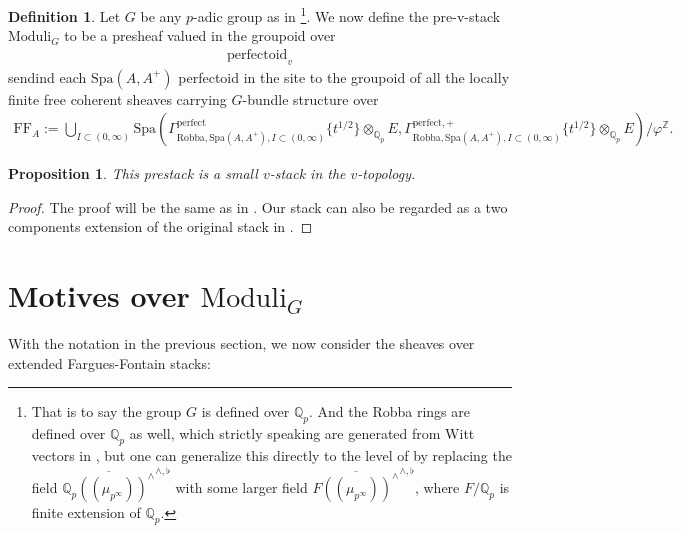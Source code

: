 \documentclass[12pt]{book}
\newtheorem{proposition}{Proposition}
\theoremstyle{definition}
\newtheorem{definition}{Definition}
\begin{document}
\begin{definition}
Let $G$ be any $p$-adic group as in \cite{FS}\footnote{That is to say the group $G$ is defined over $\mathbb{Q}_p$. And the Robba rings are defined over $\mathbb{Q}_p$ as well, which strictly speaking are generated from Witt vectors in \cite{KL1}, but one can generalize this directly to the level of \cite{KL2} by replacing the field $\overline{{\mathbb{Q}}_p((\mu_{p^\infty}))^\wedge}^{\wedge,\flat}$ with some larger field $\overline{F((\mu_{p^\infty}))^\wedge}^{\wedge,\flat}$, where $F/\mathbb{Q}_p$ is finite extension of $\mathbb{Q}_p$.}. We now define the pre-v-stack $\text{Moduli}_G$ to be a presheaf valued in the groupoid over
\begin{align}
\text{perfectoid}_{v} 
\end{align}
sendind each $\mathrm{Spa}(A,A^+)$ perfectoid in the site to the groupoid of all the locally finite free coherent sheaves carrying $G$-bundle structure over  
\begin{align}
\mathrm{FF}_A:=\bigcup_{I\subset (0,\infty)}\mathrm{Spa}(\Gamma^\text{perfect}_{\text{Robba},\mathrm{Spa}(A,A^+),I\subset (0,\infty)}\{t^{1/2}\}\otimes_{\mathbb{Q}_p}E,\Gamma^{\text{perfect},+}_{\text{Robba},\mathrm{Spa}(A,A^+),I\subset (0,\infty)}\{t^{1/2}\}\otimes_{\mathbb{Q}_p}E)/\varphi^\mathbb{Z}.
\end{align}
\end{definition}

\begin{proposition}
This prestack is a small $v$-stack in the $v$-topology.
\end{proposition}

\begin{proof}
The proof will be the same as in \cite[Proposition III.1.3]{FS}. Our stack can also be regarded as a two components extension of the original stack in \cite{FS}.  
\end{proof}



\section{Motives over $\mathrm{Moduli}_G$}

\noindent With the notation in the previous section, we now consider the sheaves over extended Fargues-Fontain stacks:
\end{document}
